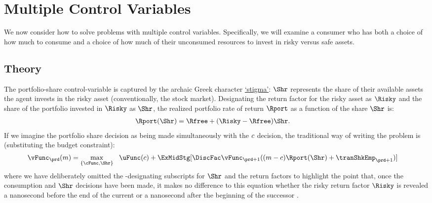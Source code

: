 \documentclass[SolvingMicroDSOPs]{subfiles}
\begin{document}
\hypertarget{multiple-control-variables}{}
\section{Multiple Control Variables}\label{sec:multiple-control-variables}
We now consider how to solve problems with multiple control variables.  Specifically, we will examine a consumer who has both a choice of how much to consume and a choice of how much of their unconsumed resources to invest in risky versus safe assets.


\subsection{Theory}\label{subsec:MCTheory}

The portfolio-share control-variable is captured by the archaic Greek character \href{https://en.wikipedia.org/wiki/Stigma_(ligature)}{`stigma'}:  $\Shr$ represents the share of their available assets the agent invests in the risky asset (conventionally, the stock market).  Designating the return factor for the risky asset as $\Risky$ and the share of the portfolio invested in $\Risky$ as $\Shr$, the realized portfolio rate of return $\Rport$ as a function of the share $\Shr$ is:
\begin{equation}\begin{gathered}\begin{aligned}
      \Rport(\Shr) &= \Rfree+(\Risky-\Rfree)\Shr \label{eq:Shr}.
    \end{aligned}\end{gathered}\end{equation}
If we imagine the portfolio share decision as being made simultaneously with the $c$ decision, the traditional way of writing the problem is (substituting the budget constraint):
\begin{equation}\begin{gathered}\begin{aligned}
      \vFunc_{\prd}(m)  & = \max_{\{\cFunc,\Shr\}} ~~  \uFunc(c) + \ExMidStg[\DiscFac \vFunc_{\prd+1}((m-c)\Rport(\Shr) + {\tranShkEmp}_{\prd+1})] \label{eq:Bellmanundated}
    \end{aligned}\end{gathered}\end{equation}
where we have deliberately omitted the {\interval}-designating subscripts for $\Shr$ and the return factors to highlight the point that, once the consumption and $\Shr$ decisions have been made, it makes no difference to this equation whether the risky return factor $\Risky$ is revealed a nanosecond before the end of the current {\interval} or a nanosecond after the beginning of the successor {\interval}.
\end{document}
